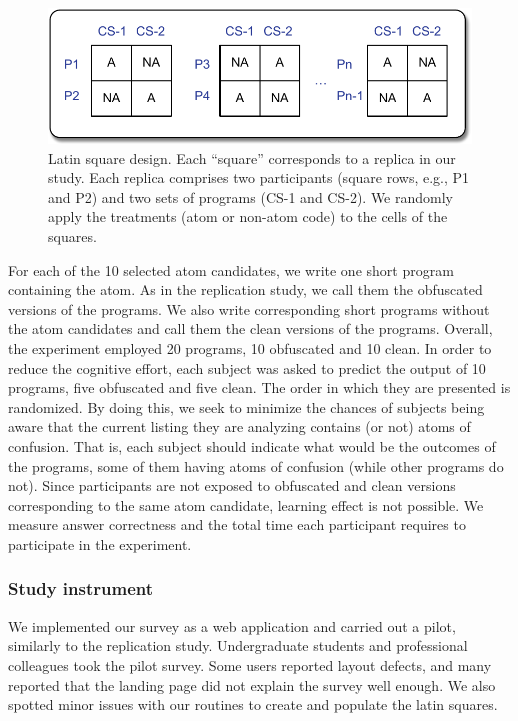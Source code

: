   \begin{figure}[htb!]
      \noindent
      \centering
      \includegraphics[scale=.50]{images/latin-square.pdf}
      \caption{Latin square design. Each ``square'' corresponds to 
      a replica in our study. Each replica comprises two participants (square rows, e.g., P1 and P2) 
      and two sets of programs (CS-1 and CS-2). We randomly apply the 
      treatments (atom or non-atom code) to the cells of the squares.} 
      \label{fig:latinsquare}
  \end{figure}

For each of the 10 selected atom candidates, we write one short program containing the atom. As in the replication study, we call them the obfuscated versions of the programs. We also write corresponding short programs without the atom candidates and call them the clean versions of the programs. Overall, the experiment employed 20 programs, 10 obfuscated and 10 clean. In order to reduce the cognitive effort, each subject was asked to predict the output of 10 programs, five obfuscated and five clean. The order in which they are presented is randomized. By doing this, we seek to minimize the chances of subjects being aware that the current listing they are analyzing contains (or not) atoms of confusion. That is, each subject should indicate what would be the outcomes of the programs, some of them having atoms of confusion (while other programs do not). Since participants are not exposed to obfuscated and clean versions corresponding to the same atom candidate, learning effect is not possible. We measure answer correctness and the total time each participant requires to participate in the experiment.

\subsubsection*{Study instrument} 

We implemented our survey as a web application and carried out a pilot, similarly to the replication study. 
Undergraduate students and professional colleagues took the pilot survey. Some users reported layout defects, and many reported that the landing page did not explain the survey well enough. We also spotted minor issues with our routines to create and populate the latin squares. 

